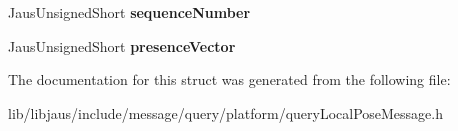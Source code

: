 \begin{DoxyCompactItemize}
\item 
\hypertarget{struct_query_local_pose_message_struct_a385b623043e004ec0bfa501f6bc45b8c}{\-Jaus\-Unsigned\-Short {\bfseries sequence\-Number}}\label{struct_query_local_pose_message_struct_a385b623043e004ec0bfa501f6bc45b8c}

\item 
\hypertarget{struct_query_local_pose_message_struct_abb14102d50669f83bfa2fb2f65d2d40f}{\-Jaus\-Unsigned\-Short {\bfseries presence\-Vector}}\label{struct_query_local_pose_message_struct_abb14102d50669f83bfa2fb2f65d2d40f}

\end{DoxyCompactItemize}


\-The documentation for this struct was generated from the following file\-:\begin{DoxyCompactItemize}
\item 
lib/libjaus/include/message/query/platform/query\-Local\-Pose\-Message.\-h\end{DoxyCompactItemize}
